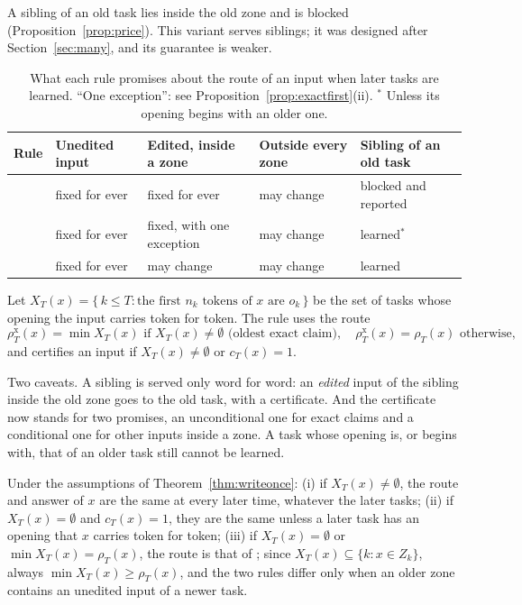 A sibling of an old task lies inside the old zone and is blocked (Proposition~\ref{prop:price}). This
variant serves siblings; it was designed after Section~\ref{sec:many}, and its guarantee is weaker.

\begin{table}[!htbp]
  \caption{What each rule promises about the route of an input when later tasks are learned.
  ``One exception'': see Proposition~\ref{prop:exactfirst}(ii). $^*$ Unless its opening begins with an older one.}
  \label{tab:guarantees}
  \centering
  \footnotesize
  \setlength{\tabcolsep}{4pt}
  \begin{tabular}{lllll}
    \toprule
    Rule & Unedited input & Edited, inside a zone & Outside every zone & Sibling of an old task \\
    \midrule
    \cert{} & fixed for ever & fixed for ever & may change & blocked and reported \\
    \exactfirst{} & fixed for ever & fixed, with one exception & may change & learned$^*$ \\
    \nearest{} & fixed for ever & may change & may change & learned \\
    \bottomrule
  \end{tabular}
\end{table}

\begin{definition}
Let $X_T(x) = \{\, k \le T : \text{the first } n_k \text{ tokens of } x \text{ are } o_k \,\}$ be the
set of tasks whose opening the input carries token for token. The rule \exactfirst{} uses the route
\begin{equation}
  \rho^{\mathrm{x}}_T(x) = \min X_T(x) \text{ if } X_T(x) \neq \emptyset \text{ (oldest exact claim)}, \quad
  \rho^{\mathrm{x}}_T(x) = \rho_T(x) \text{ otherwise},
  \label{eq:exactfirst}
\end{equation}
and certifies an input if $X_T(x) \neq \emptyset$ or $c_T(x) = 1$.
\end{definition}

Two caveats. A sibling is served only word for word: an \emph{edited} input of the sibling inside the
old zone goes to the old task, with a certificate. And the certificate now stands for two promises, an
unconditional one for exact claims and a conditional one for other inputs inside a zone. A task whose
opening is, or begins with, that of an older task still cannot be learned.

\begin{proposition}
\label{prop:exactfirst}
Under the assumptions of Theorem~\ref{thm:writeonce}: (i) if $X_T(x) \neq \emptyset$, the route and answer of $x$ are the same at every later time,
whatever the later tasks; (ii) if $X_T(x) = \emptyset$ and $c_T(x) = 1$, they are the same unless a
later task has an opening that $x$ carries token for token; (iii) if $X_T(x) = \emptyset$ or
$\min X_T(x) = \rho_T(x)$, the route is that of \cert{}; since $X_T(x)\subseteq\{k: x\in Z_k\}$, always $\min X_T(x)\ge\rho_T(x)$, and the two rules differ only when an older zone contains an unedited input of a newer task.
\end{proposition}

